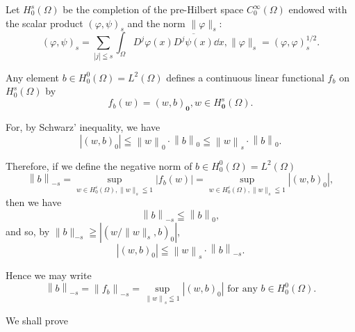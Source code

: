 \label{sec:III.10}

Let $H_{0}^{s}(\Omega)$ be the completion of the pre-Hilbert space $C_{0}^{\infty}(\Omega)$ endowed with the scalar product $(\varphi, \psi)_{s}$ and the norm $\| \varphi \|_{s}$: 
\begin{equation}\label{eq:III.10.1}
(\varphi , \psi) _{s} = \sum\limits_{| j | \leqq s} \int_{\Omega} D ^{j} \varphi (x) \overline {{D ^{j} \psi (x)}} \dd x, \| \varphi \| _{s} = (\varphi , \varphi) _{s} ^{1/2}.
\end{equation}

Any element $b \in H_0^0(\Omega) = L^2(\Omega)$ defines a continuous linear functional $f_b$ on $H_0^s(\Omega)$ by 
\begin{equation}\label{eq:III.10.2}
f _{b} (w) = (w, b) _ {\mathbf {0}}, w \in H _ {\mathbf {0}} ^{s} (\Omega).
\end{equation}

For, by Schwarz' inequality, we have 
\[
\left| (w, b) _{0} \right| \leqq \left\| w \right\| _{0} \cdot \left\| b \right\| _{0} \leqq \left\| w \right\| _{s} \cdot \left\| b \right\| _{0}.
\]

Therefore, if we define the negative norm of $b \in H_0^0(\Omega) = L^2(\Omega)$ 
\begin{equation}\label{eq:III.10.3}
\left\| b \right\| _{-s} = \sup\limits _ {w \in H _{0} ^{\varepsilon} (\Omega), \| w \| _{s} \leqq 1} \left| f _{b} (w) \right| = \sup\limits _ {w \in H _{0} ^{\varepsilon} (\Omega), \| w \| _{s} \leqq 1} \left| (w, b) _{0} \right|,
\end{equation}
then we have 
\begin{equation}\label{eq:III.10.4}
\left\| b \right\| _{-s} \leqq \left\| b \right\| _{0},
\end{equation}
and so, by $\|b\|_{-s} \geqq |(w/\|w\|_s, b)_0|$, 
\begin{equation}\label{eq:III.10.5}
\left| (w, b) _{0} \right| \leqq \left\| w \right\| _{s} \cdot \left\| b \right\| _{-s}.
\end{equation}

Hence we may write 
\begin{equation}\tag{3'}\label{eq:III.10.3'}
\left\| b \right\| _{-s} = \left\| f _{b} \right\| _{-s} = \sup\limits _ {\left\| w \right\| _{s} \leqq 1} | (w, b) _{0} | \text{ for any } b \in H _{0} ^{0} (\Omega).
\end{equation}

We shall prove 

